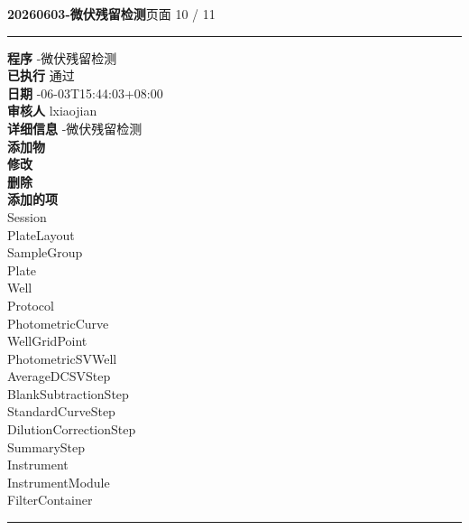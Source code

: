 \documentclass[UTF8,10pt,a4paper,fontset=fandol]{ctexart}
\begin{document}
\newpage

\begin{center}
\textbf{20260603-微伏残留检测}\hfill 页面 10 / 11
\end{center}
\hrule

\small
\begin{flushleft}
\textbf{程序} -微伏残留检测\\
\textbf{已执行} \quad 通过\\
\textbf{日期} -06-03T15:44:03+08:00\\
\textbf{审核人} \quad lxiaojian\\
\textbf{详细信息} -微伏残留检测\\[2pt]
\textbf{添加物} \\
\textbf{修改} \\
\textbf{删除} \\[2pt]
\textbf{添加的项}\\
\quad Session\\
\quad PlateLayout\\
\quad SampleGroup\\
\quad Plate\\
\quad Well\\
\quad Protocol\\
\quad PhotometricCurve\\
\quad WellGridPoint\\
\quad PhotometricSVWell\\
\quad AverageDCSVStep\\
\quad BlankSubtractionStep\\
\quad StandardCurveStep\\
\quad DilutionCorrectionStep\\
\quad SummaryStep\\
\quad Instrument\\
\quad InstrumentModule\\
\quad FilterContainer
\end{flushleft}

\hrule
\end{document}
